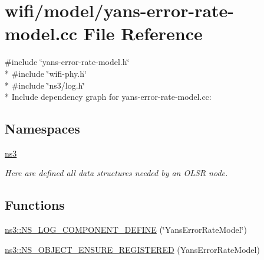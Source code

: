 \hypertarget{yans-error-rate-model_8cc}{}\section{wifi/model/yans-\/error-\/rate-\/model.cc File Reference}
\label{yans-error-rate-model_8cc}
{\ttfamily \#include \char`\"{}yans-\/error-\/rate-\/model.\+h\char`\"{}}\\*
{\ttfamily \#include \char`\"{}wifi-\/phy.\+h\char`\"{}}\\*
{\ttfamily \#include \char`\"{}ns3/log.\+h\char`\"{}}\\*
Include dependency graph for yans-\/error-\/rate-\/model.cc\+:
\subsection*{Namespaces}
\begin{DoxyCompactItemize}
\item 
 \hyperlink{namespacens3}{ns3}
\begin{DoxyCompactList}\small\item\em Here are defined all data structures needed by an O\+L\+SR node. \end{DoxyCompactList}\end{DoxyCompactItemize}
\subsection*{Functions}
\begin{DoxyCompactItemize}
\item 
\hyperlink{namespacens3_a1d2c2259398d48b1268cc5fe4ef5f665}{ns3\+::\+N\+S\+\_\+\+L\+O\+G\+\_\+\+C\+O\+M\+P\+O\+N\+E\+N\+T\+\_\+\+D\+E\+F\+I\+NE} (\char`\"{}Yans\+Error\+Rate\+Model\char`\"{})
\item 
\hyperlink{namespacens3_a44daabc127680a3b9d0b97f8527e3327}{ns3\+::\+N\+S\+\_\+\+O\+B\+J\+E\+C\+T\+\_\+\+E\+N\+S\+U\+R\+E\+\_\+\+R\+E\+G\+I\+S\+T\+E\+R\+ED} (Yans\+Error\+Rate\+Model)
\end{DoxyCompactItemize}

